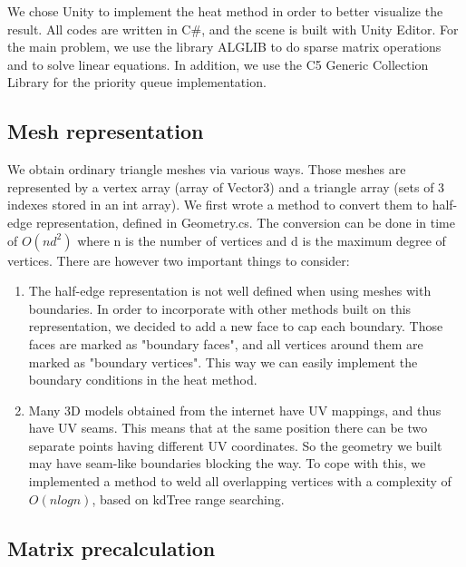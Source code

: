 \documentclass[a4paper,12pt,twoside]{article}
\begin{document}
We chose Unity to implement the heat method in order to better visualize the result. All codes are written in C\#, and the scene is built with Unity Editor. For the main problem, we use the library ALGLIB to do sparse matrix operations and to solve linear equations. In addition, we use the C5 Generic Collection Library for the priority queue implementation.


\subsection{Mesh representation}

We obtain ordinary triangle meshes via various ways. Those meshes are represented by a vertex array (array of Vector3) and a triangle array (sets of 3 indexes stored in an int array). We first wrote a method to convert them to half-edge representation, defined in Geometry.cs. The conversion can be done in time of $O(nd^2)$ where n is the number of vertices and d is the maximum degree of vertices. There are however two important things to consider:

\begin{enumerate}

\item
The half-edge representation is not well defined when using meshes with boundaries. In order to incorporate with other methods built on this representation, we decided to add a new face to cap each boundary. Those faces are marked as "boundary faces", and all vertices around them are marked as "boundary vertices". This way we can easily implement the boundary conditions in the heat method.

\item
Many 3D models obtained from the internet have UV mappings, and thus have UV seams. This means that at the same position there can be two separate points having different UV coordinates. So the geometry we built may have seam-like boundaries blocking the way. To cope with this, we implemented a method to weld all overlapping vertices with a complexity of $O(nlogn)$, based on kdTree range searching.

\end{enumerate}

\subsection{Matrix precalculation}
\end{document}
